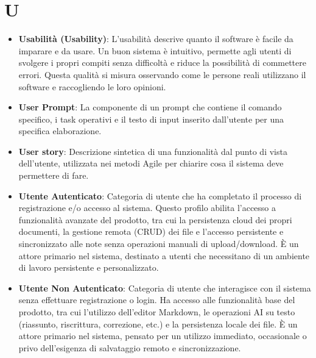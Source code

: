 \documentclass[11pt,a4paper]{article}
\begin{document}
\section*{U}
\begin{itemize}
\item \textbf{Usabilità (Usability)}: L’usabilità descrive quanto il software è facile da imparare e da usare. Un buon sistema è intuitivo, permette agli utenti di svolgere i propri compiti senza difficoltà e riduce la possibilità di commettere errori. Questa qualità si misura osservando come le persone reali utilizzano il software e raccogliendo le loro opinioni.

\item \textbf{User Prompt}: La componente di un prompt che contiene il comando specifico, i task operativi e il testo di input inserito dall'utente per una specifica elaborazione.

\item \textbf{User story}: Descrizione sintetica di una funzionalità dal punto di vista dell’utente, utilizzata nei metodi Agile per chiarire cosa il sistema deve permettere di fare.

\item \textbf{Utente Autenticato}: Categoria di utente che ha completato il processo di registrazione e/o accesso al sistema. Questo profilo abilita l'accesso a funzionalità avanzate del prodotto, tra cui la persistenza cloud dei propri documenti, la gestione remota (CRUD) dei file e l'accesso persistente e sincronizzato alle note senza operazioni manuali di upload/download. È un attore primario nel sistema, destinato a utenti che necessitano di un ambiente di lavoro persistente e personalizzato.

\item \textbf{Utente Non Autenticato}: Categoria di utente che interagisce con il sistema senza effettuare registrazione o login. Ha accesso alle funzionalità base del prodotto, tra cui l'utilizzo dell'editor Markdown, le operazioni AI su testo (riassunto, riscrittura, correzione, etc.) e la persistenza locale dei file. È un attore primario nel sistema, pensato per un utilizzo immediato, occasionale o privo dell'esigenza di salvataggio remoto e sincronizzazione.

\end{itemize}

\newpage
\end{document}
